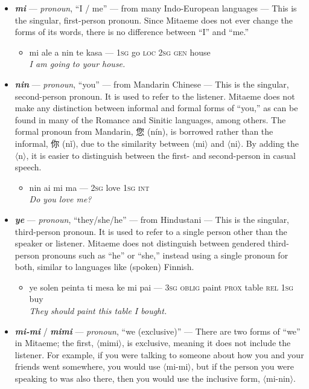 \documentclass[a4paper]{article}
\begin{document}
\begin{itemize}
	\item \textbf{\textit{mi}} — \textit{pronoun}, ``I / me'' — from many Indo-European languages — This is the singular, first-person pronoun. Since Mitaeme does not ever change the forms of its words, there is no difference between ``I'' and ``me.''
	\begin{itemize}
		\item mi ale a nin te kasa — \textsc{1sg} go \textsc{loc 2sg gen} house \\\textit{I am going to your house.}
	\end{itemize}
	\item \textbf{\textit{nin}} — \textit{pronoun}, ``you'' — from Mandarin Chinese — This is the singular, second-person pronoun. It is used to refer to the listener. Mitaeme does not make any distinction between informal and formal forms of ``you,'' as can be found in many of the Romance and Sinitic languages, among others. The formal pronoun from Mandarin, 您 (nín), is borrowed rather than the informal, 你 (nǐ), due to the similarity between $\langle$mi$\rangle$ and $\langle$ni$\rangle$. By adding the $\langle$n$\rangle$, it is easier to distinguish between the first- and second-person in casual speech.
	\begin{itemize}
		\item nin ai mi ma — \textsc{2sg} love \textsc{1sg int} \\\textit{Do you love me?}
	\end{itemize}
	\item \textbf{\textit{ye}} — \textit{pronoun}, ``they/she/he'' — from Hindustani — This is the singular, third-person pronoun. It is used to refer to a single person other than the speaker or listener. Mitaeme does not distinguish between gendered third-person pronouns such as ``he'' or ``she,'' instead using a single pronoun for both, similar to languages like (spoken) Finnish.
	\begin{itemize}
		\item ye solen peinta ti mesa ke mi pai — \textsc{3sg oblig} paint \textsc{prox} table \textsc{rel 1sg} buy \\\textit{They should paint this table I bought.}
	\end{itemize}
	\item \textbf{\textit{mi-mi}} / \textbf{\textit{mimi}} — \textit{pronoun}, ``we (exclusive)'' — There are two forms of ``we'' in Mitaeme; the first, $\langle$mimi$\rangle$, is exclusive, meaning it does not include the listener. For example, if you were talking to someone about how you and your friends went somewhere, you would use $\langle$mi-mi$\rangle$, but if the person you were speaking to was also there, then you would use the inclusive form, $\langle$mi-nin$\rangle$.

\end{itemize}
\end{document}
